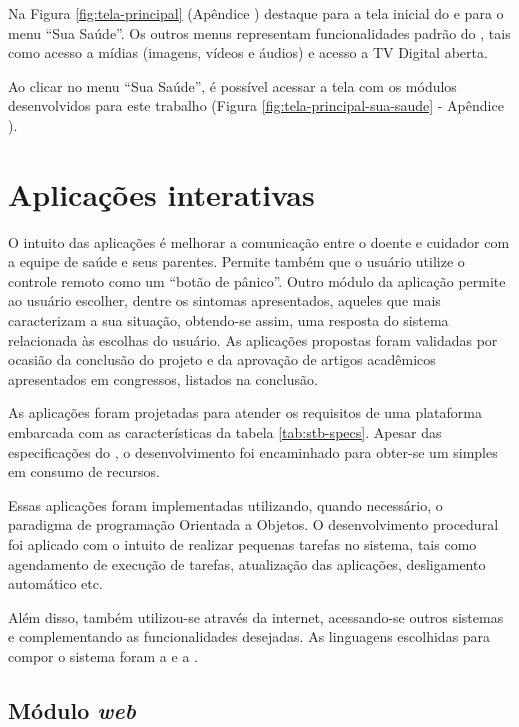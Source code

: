 Na Figura \ref{fig:tela-principal} (Apêndice )
destaque para a tela inicial do \software[] \xbmc[] e para o menu ``Sua
Saúde''.  Os outros menus representam funcionalidades padrão do \software[] \xbmc, 
tais como acesso a mídias (imagens, vídeos e áudios) e acesso a TV
Digital aberta.

Ao clicar no menu ``Sua Saúde'', é possível acessar a tela com os módulos desenvolvidos
para este trabalho (Figura \ref{fig:tela-principal-sua-saude} - Apêndice 
).

\section{Aplicações interativas} \label{subsec:aplicacoes-tv-health}

O intuito das aplicações é melhorar a comunicação entre o doente e cuidador com
a equipe de saúde e seus parentes. Permite também que o usuário utilize o
controle remoto como um ``botão de pânico''. Outro módulo da aplicação permite
ao usuário escolher, dentre os sintomas apresentados, aqueles que mais
caracterizam a sua situação, obtendo-se assim, uma resposta do sistema
relacionada às escolhas do usuário. As aplicações  propostas foram validadas
por ocasião da conclusão do projeto \nextsaude[] e da aprovação de artigos
acadêmicos apresentados em congressos, listados na conclusão.

As aplicações foram projetadas para atender os requisitos de uma plataforma
embarcada com as características da tabela \ref{tab:stb-specs}. Apesar 
das especificações do \hardware[], o desenvolvimento foi encaminhado para 
obter-se um \software[] simples em consumo de recursos.

Essas aplicações foram implementadas utilizando, quando necessário, o paradigma
de programação Orientada a Objetos. O desenvolvimento procedural foi aplicado
com o intuito de realizar pequenas tarefas no sistema, tais como agendamento
de execução de tarefas, atualização das aplicações, desligamento automático etc.

Além disso, também utilizou-se \webservices[] através da internet, acessando-se
outros sistemas e complementando as funcionalidades desejadas. As linguagens
escolhidas para compor o sistema foram a \python[] e a \shell.

\subsection{Módulo \textit{web}}


